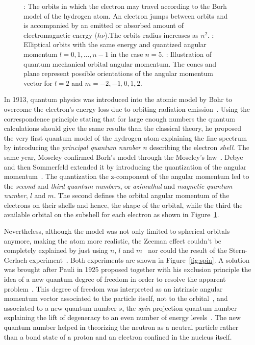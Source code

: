 \begin{figure}
\begin{minipage}{\linewidth}
			\subcaption{\label{fig:quantum-numbers:C}}
		\end{minipage}
		\caption{\label{fig:quantum-numbers} : The orbits in which the electron may travel according to the Borh model of the hydrogen atom. An electron jumps between orbits and is accompanied by an emitted or absorbed amount of electromagnetic energy ($h\nu$).The orbits radius increases as $n^2$. : Elliptical orbits with the same energy and quantized angular momentum $l= 0, 1,...,n-1$ in the case $n=5$. : Illustration of quantum mechanical orbital angular momentum. The cones and plane represent possible orientations of the angular momentum vector for $l=2$ and $m=-2,-1,0,1,2$.}
		\vspace{-5pt}
	\end{figure}
	
	In 1913, quantum physics was introduced into the atomic model by Bohr to overcome the electron's energy loss due to orbiting radiation emission~\cite{BOHR1913}. Using the correspondence principle stating that for large enough numbers the quantum calculations should give the same results than the classical theory, he proposed the very first quantum model of the hydrogen atom explaining the line spectrum by introducing the \textit{principal quantum number} $n$ describing the electron \textit{shell}. The same year, Moseley confirmed Borh's model through the Moseley's law~\cite{MOSELEY1913}. Debye and then Sommerfeld extended it by introducing the quantization of the angular momentum~\cite{SOMMERFELD1916}. The quantization the z-component of the angular momentum led to the \textit{second} and \textit{third quantum numbers}, or \textit{azimuthal} and \textit{magnetic quantum number}, $l$ and $m$. The second defines the orbital angular momentum of the electrons on their shells and hence, the shape of the orbital, while the third the available orbital on the subshell for each electron as shown in Figure~\ref{fig:quantum-numbers}.
	
	Nevertheless, although the model was not only limited to spherical orbitals anymore, making the atom more realistic, the Zeeman effect couldn't be completely explained by just using $n$, $l$ and $m$~\cite{ZEEMAN431897,ZEEMAN441897I,ZEEMAN441897II,ZEEMAN451898} nor could the result of the Stern-Gerlach experiment~\cite{GERLACH1922}. Both experiments are shown in Figure~\ref{fig:spin}. A solution was brought after Pauli in 1925 proposed together with his exclusion principle the idea of a new quantum degree of freedom in order to resolve the apparent problem~\cite{PAULI1925I,PAULI1925II}. This degree of freedom was interpreted as an intrinsic angular momentum vector associated to the particle itself, not to the orbital~\cite{UHLENBECK1926}, and associated to a new quantum number $s$, the \textit{spin} projection quantum number explaining the lift of degeneracy to an even number of energy levels~\cite{PAULI1927}. The new quantum number helped in theorizing the neutron as a neutral particle rather than a bond state of a proton and an electron confined in the nucleus itself.
	
